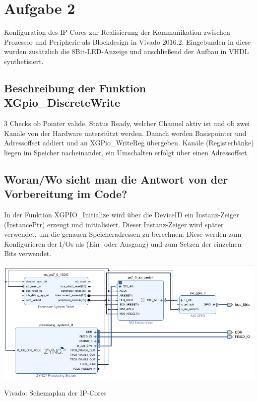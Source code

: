 \section{Aufgabe 2} \label{ex2}

Konfiguration des IP Cores zur Realisierung der Kommunikation zwischen Prozessor und 
Peripherie als Blockdesign in Vivado 2016.2. Eingebunden in diese wurden zusätzlich die 8Bit-LED-Anzeige und anschließend der Aufbau in VHDL synthetisiert.

\subsection{Beschreibung der Funktion XGpio\_DiscreteWrite}
3 Checks ob Pointer valide, Status Ready, welcher Channel aktiv ist und ob zwei Kanäle von der Hardware unterstützt werden. Danach werden Basispointer und Adressoffset addiert und an XGPio\_WriteReg übergeben. Kanäle (Registerbänke) liegen im Speicher nacheinander, ein Umschalten erfolgt über einen Adressoffset.\\

\subsection{Woran/Wo sieht man die Antwort von der Vorbereitung im Code?}
In der Funktion XGPIO\_Initialize wird über die DeviceID ein Instanz-Zeiger (InstancePtr) erzeugt und initialisiert. Dieser Instanz-Zeiger wird später verwendet, um die genauen Speicheradressen zu berechnen. Diese werden zum Konfigurieren der I/Os als (Ein- oder Ausgang) und zum Setzen der einzelnen Bits verwendet.\\

\begin{minipage}{\textwidth}
    \begin{center}        
        \includegraphics[scale=0.7]{img/a2.png} 
    \end{center}
\end{minipage}
\begin{center}
Vivado: Schemaplan der IP-Cores
\end{center}

